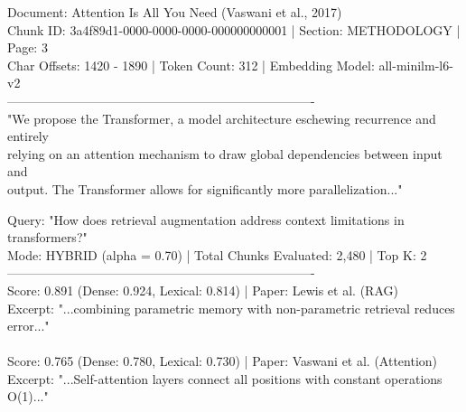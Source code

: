\documentclass[11pt,a4paper,titlepage]{report}
\begin{document}
\begin{tcolorbox}[colback=white, colframe=primaryTeal, width=\textwidth, arc=3pt, title={Inspection Modal: Verbatim Document Chunk Provenance}]
\footnotesize\ttfamily
Document: Attention Is All You Need (Vaswani et al., 2017)\\
Chunk ID: 3a4f89d1-0000-0000-0000-000000000001 | Section: METHODOLOGY | Page: 3\\
Char Offsets: 1420 - 1890 | Token Count: 312 | Embedding Model: all-minilm-l6-v2\\
-------------------------------------------------------------------------\\
"We propose the Transformer, a model architecture eschewing recurrence and entirely\\
relying on an attention mechanism to draw global dependencies between input and\\
output. The Transformer allows for significantly more parallelization..."
\end{tcolorbox}
\vspace{-2pt}
\label{fig:chunk_viewer}
\vspace{6pt}

\begin{tcolorbox}[colback=white, colframe=primaryTeal, width=\textwidth, arc=3pt, title={Search Execution Output: Sample Query with Scores}]
\footnotesize\ttfamily
Query: "How does retrieval augmentation address context limitations in transformers?"\\
Mode: HYBRID (alpha = 0.70) | Total Chunks Evaluated: 2,480 | Top K: 2\\
-------------------------------------------------------------------------\\
[Rank 1] Score: 0.891 (Dense: 0.924, Lexical: 0.814) | Paper: Lewis et al. (RAG)\\
Excerpt: "...combining parametric memory with non-parametric retrieval reduces error..."\\
\\
[Rank 2] Score: 0.765 (Dense: 0.780, Lexical: 0.730) | Paper: Vaswani et al. (Attention)\\
Excerpt: "...Self-attention layers connect all positions with constant operations O(1)..."
\end{tcolorbox}
\vspace{-2pt}
\label{fig:search_results}
\vspace{6pt}
\end{document}
